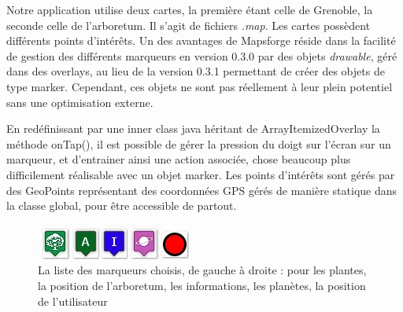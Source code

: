 \documentclass[a4paper,11pt]{article}
\begin{document}
		Notre application utilise deux cartes, la première étant celle de Grenoble, la seconde celle de l'arboretum. Il s'agit de fichiers \emph{.map}. 
		Les cartes possèdent différents points d'intérêts. Un des avantages de Mapsforge réside dans la facilité de gestion des différents marqueurs en version 0.3.0 par des objets \emph{drawable}, 
		géré dans des overlays, au lieu de la version 0.3.1 permettant de créer des objets de type marker. 
		Cependant, ces objets ne sont pas réellement à leur plein potentiel sans une optimisation externe. 
		
		En redéfinissant par une inner class java héritant de ArrayItemizedOverlay la méthode onTap(), 
		il est possible de gérer la pression du doigt sur l'écran sur un marqueur, et d'entrainer ainsi une action associée, 
		chose beaucoup plus difficilement réalisable avec un objet marker. 
		Les points d'intérêts sont gérés par des GeoPoints représentant des coordonnées GPS gérés de manière statique dans la classe global, pour être accessible de partout.
		
		 \begin{figure}[H]
     \begin{center}
      \includegraphics{listemarker.jpg}
      \caption{La liste des marqueurs choisis, de gauche à droite : pour les plantes, la position de l'arboretum, les informations, les planètes, la position de l'utilisateur}
     \end{center}
    \end{figure}
			
\end{document}
